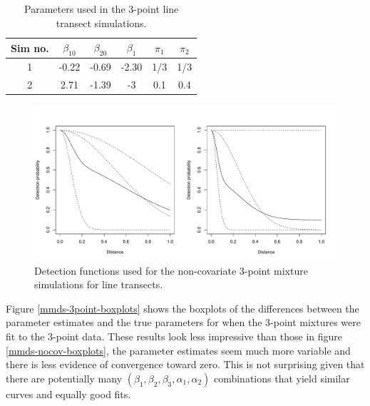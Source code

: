 \begin{table}[h]
\centering
\begin{tabular}{c c c c c c}
Sim no. & $\beta_{10}$ & $\beta_{20}$ & $\beta_1$ & $\pi_1$ & $\pi_2$\\
\hline
\hline
1 & -0.22 & -0.69 & -2.30 & 1/3 & 1/3 \\ 
2 &  2.71 & -1.39 & -3 & 0.1 & 0.4 \\
\end{tabular}
\label{mmds-3pt-simtable}
\caption{Parameters used in the 3-point line transect simulations.}
\end{table}

\begin{figure}
\centering
\includegraphics[width=6in]{mix/figs/3pt-detfcts.pdf}
\caption{Detection functions used for the non-covariate 3-point mixture simulations for line transects.}
\label{mmds-3pt-funcs}
\end{figure}

Figure \ref{mmds-3point-boxplots} shows the boxplots of the differences between the parameter estimates and the true parameters for when the 3-point mixtures were fit to the 3-point data. These results look less impressive than those in figure \ref{mmds-nocov-boxplots}, the parameter estimates seem much more variable and there is less evidence of convergence toward zero. This is not surprising given that there are potentially many $(\beta_1, \beta_2, \beta_3, \alpha_1, \alpha_2)$ combinations that yield similar curves and equally good fits.

